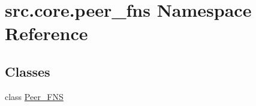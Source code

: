 \hypertarget{namespacesrc_1_1core_1_1peer__fns}{}\section{src.\+core.\+peer\+\_\+fns Namespace Reference}
\label{namespacesrc_1_1core_1_1peer__fns}
\subsection*{Classes}
\begin{DoxyCompactItemize}
\item 
class \hyperlink{classsrc_1_1core_1_1peer__fns_1_1Peer__FNS}{Peer\+\_\+\+F\+N\+S}
\end{DoxyCompactItemize}
